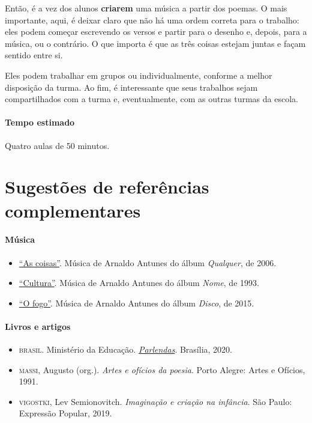 \documentclass[11pt]{extarticle}
\begin{document}
Então, é a vez dos alunos \textbf{criarem} uma música a partir dos poemas.
O mais importante, aqui, é deixar claro que não há uma ordem
correta para o trabalho: eles podem começar escrevendo os versos
e partir para o desenho e, depois, para a música, ou o contrário. 
O que importa é que as três coisas estejam juntas e façam sentido entre si.

Eles podem trabalhar em grupos ou individualmente,
conforme a melhor disposição da turma. 
Ao fim, é interessante que seus trabalhos sejam compartilhados
com a turma e, eventualmente, com as outras turmas da escola.

\paragraph{Tempo estimado} Quatro aulas de 50 minutos.


\section{Sugestões de referências complementares}

\paragraph{Música}

\begin{itemize}
\item \href{https://www.youtube.com/watch?v=JF4MruZSwzg}{``As coisas''}. Música de Arnaldo Antunes do álbum \textit{Qualquer}, de 2006.  

\item \href{https://www.youtube.com/watch?v=Aguu_QzCQy8}{``Cultura''}. Música de Arnaldo Antunes do álbum \textit{Nome}, de 1993.  

\item \href{https://www.youtube.com/watch?v=kUgUNHj2VlE}{``O fogo''}. Música de Arnaldo Antunes do álbum \textit{Disco}, de 2015.  
\end{itemize}


\paragraph{Livros e artigos}

\begin{itemize}
	
\item \textsc{brasil}. Ministério da Educação. \href{http://alfabetizacao.mec.gov.br/images/conta-pra-mim/livros/versao_digital/parlendas_versao_digital.pdf}{\textit{Parlendas}}. Brasília, 2020. 

\item \textsc{massi}, Augusto (org.). \emph{Artes e ofícios da poesia}. Porto Alegre:
  Artes e Ofícios, 1991.

\item \textsc{vigostki}, Lev Semionovitch. \textit{Imaginação e criação na infância}. São Paulo: Expressão Popular, 2019.
\end{itemize}
\end{document}
